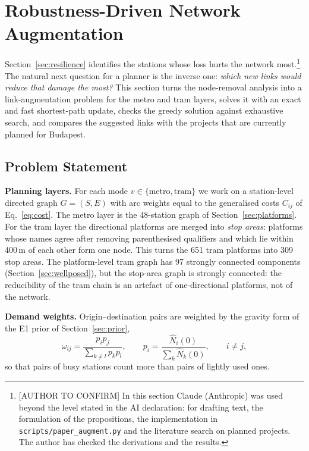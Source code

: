 \documentclass[12pt,a4paper]{article}
\theoremstyle{plain}
\theoremstyle{definition}
\theoremstyle{remark}
\begin{document}


\section{Robustness-Driven Network Augmentation}
\label{sec:augment}

Section~\ref{sec:resilience} identifies the stations whose loss hurts the
network most.\footnote{[AUTHOR TO CONFIRM] In this section Claude (Anthropic)
was used beyond the level stated in the AI declaration: for drafting text,
the formulation of the propositions, the implementation in
\texttt{scripts/paper\_augment.py} and the literature search on planned
projects. The author has checked the derivations and the results.} The natural next question for a planner is the inverse one:
\emph{which new links would reduce that damage the most?}  This section turns
the node-removal analysis into a link-augmentation problem for the metro and
tram layers, solves it with an exact and fast shortest-path update, checks the
greedy solution against exhaustive search, and compares the suggested links
with the projects that are currently planned for Budapest.

\subsection{Problem Statement}

\textbf{Planning layers.}  For each mode $v\in\{\text{metro},\text{tram}\}$ we
work on a station-level directed graph $G=(S,E)$ with arc weights equal to the
generalised costs $C_{ij}$ of Eq.~\eqref{eq:cost}.  The metro layer is the
48-station graph of Section~\ref{sec:platforms}.  For the tram layer the
directional platforms are merged into \emph{stop areas}: platforms whose names
agree after removing parenthesised qualifiers and which lie within 400\,m of
each other form one node.  This turns the 651 tram platforms into 309 stop
areas.  The platform-level tram graph has 97 strongly connected components
(Section~\ref{sec:wellposed}), but the stop-area graph is strongly connected:
the reducibility of the tram chain is an artefact of one-directional platforms,
not of the network.

\textbf{Demand weights.}  Origin--destination pairs are weighted by the
gravity form of the E1 prior of Section~\ref{sec:prior},
\begin{equation}
  \omega_{ij}=\frac{p_ip_j}{\sum_{k\ne l}p_kp_l},\qquad
  p_i=\frac{\hat N_i(0)}{\sum_k\hat N_k(0)},\qquad i\ne j,
  \label{eq:omega}
\end{equation}
so that pairs of busy stations count more than pairs of lightly used ones.
\end{document}
